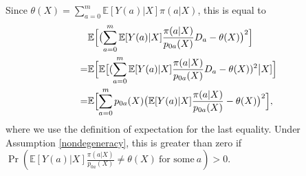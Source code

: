 \documentclass[letterpaper]{article} \usepackage{aaai19}  \usepackage{times}  \usepackage{helvet}  \usepackage{courier}  \usepackage{url}  \usepackage{graphicx}  \frenchspacing  \usepackage{comment}
\begin{document}
Since $\theta(X)=\sum_{a=0}^m\mathbb{E}[Y(a)|X]\pi(a|X)$, this is equal to
\begin{align*}
	&\mathbb{E}\Bigl[\bigl(\sum_{a=0}^m\mathbb{E}[Y(a)|X]\frac{\pi(a|X)}{p_{0a}(X)}D_a-\theta(X)\bigr)^2\Bigr]\\
	=&\mathbb{E}\Bigl[\mathbb{E}\bigl[(\sum_{a=0}^m\mathbb{E}[Y(a)|X]\frac{\pi(a|X)}{p_{0a}(X)}D_a-\theta(X))^2\bigr|X]\Bigr]\\
	=&\mathbb{E}\Bigl[\sum_{a=0}^m p_{0a}(X)\bigl(\mathbb{E}[Y(a)|X]\frac{\pi(a|X)}{p_{0a}(X)}-\theta(X)\bigr)^2\Bigr],
\end{align*}
where we use the definition of expectation for the last equality.
Under Assumption \ref{nondegeneracy}, this is greater than zero if $\Pr(\mathbb{E}[Y(a)|X]\frac{\pi(a|X)}{p_{0a}(X)}\neq \theta(X)~\text{for some}~ a)>0$.
\end{document}
